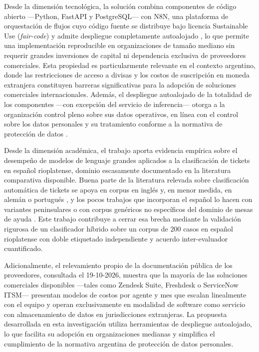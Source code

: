 Desde la dimensión tecnológica, la solución combina componentes de código abierto ---Python, FastAPI y PostgreSQL--- con N8N, una plataforma de orquestación de flujos cuyo código fuente se distribuye bajo licencia Sustainable Use (\emph{fair-code}) y admite despliegue completamente autoalojado \parencite{n8n2024_docs}, lo que permite una implementación reproducible en organizaciones de tamaño mediano sin requerir grandes inversiones de capital ni dependencia exclusiva de proveedores comerciales. Esta propiedad es particularmente relevante en el contexto argentino, donde las restricciones de acceso a divisas y los costos de suscripción en moneda extranjera constituyen barreras significativas para la adopción de soluciones comerciales internacionales. Además, el despliegue autoalojado de la totalidad de los componentes ---con excepción del servicio de inferencia--- otorga a la organización control pleno sobre sus datos operativos, en línea con el control sobre los datos personales y su tratamiento conforme a la normativa de protección de datos \parencite{Ley25326_2000}.

Desde la dimensión académica, el trabajo aporta evidencia empírica sobre el desempeño de modelos de lenguaje grandes aplicados a la clasificación de tickets en español rioplatense, dominio escasamente documentado en la literatura comparativa disponible. Buena parte de la literatura relevada sobre clasificación automática de tickets se apoya en corpus en inglés y, en menor medida, en alemán o portugués \parencite{zangari2023ticket,colavito2025benchmarking}, y los pocos trabajos que incorporan el español lo hacen con variantes peninsulares o con corpus genéricos no específicos del dominio de mesas de ayuda \parencite{grandury2025laleaderboard,mayorrocher2026spanish}. Este trabajo contribuye a cerrar esa brecha mediante la validación rigurosa de un clasificador híbrido sobre un corpus de 200 casos en español rioplatense con doble etiquetado independiente y acuerdo inter-evaluador cuantificado.

Adicionalmente, el relevamiento propio de la documentación pública de los proveedores, consultada el 19-10-2026, muestra que la mayoría de las soluciones comerciales disponibles ---tales como Zendesk Suite, Freshdesk o ServiceNow ITSM--- presentan modelos de costos por agente y mes que escalan linealmente con el equipo y operan exclusivamente en modalidad de software como servicio con almacenamiento de datos en jurisdicciones extranjeras. La propuesta desarrollada en esta investigación utiliza herramientas de despliegue autoalojado, lo que facilita su adopción en organizaciones medianas y simplifica el cumplimiento de la normativa argentina de protección de datos personales.

